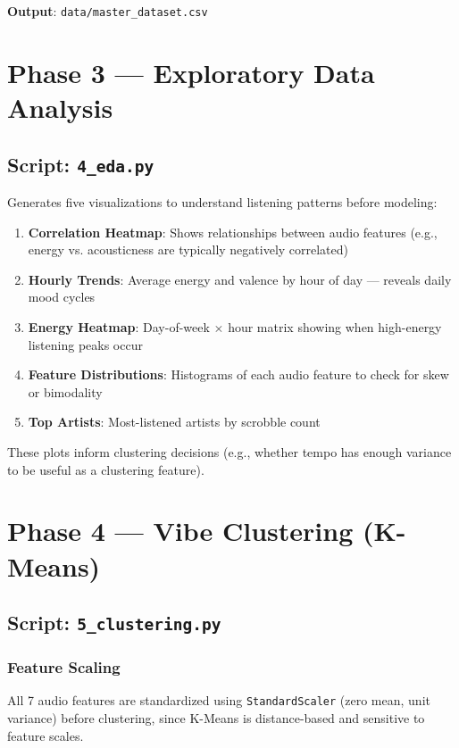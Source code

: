 \documentclass[12pt, a4paper]{article}
\begin{document}
\textbf{Output}: \texttt{data/master\_dataset.csv}

\section{Phase 3 — Exploratory Data Analysis}

\subsection{Script: \texttt{4\_eda.py}}

Generates five visualizations to understand listening patterns before modeling:

\begin{enumerate}
    \item \textbf{Correlation Heatmap}: Shows relationships between audio features (e.g., energy vs. acousticness are typically negatively correlated)
    \item \textbf{Hourly Trends}: Average energy and valence by hour of day — reveals daily mood cycles
    \item \textbf{Energy Heatmap}: Day-of-week $\times$ hour matrix showing when high-energy listening peaks occur
    \item \textbf{Feature Distributions}: Histograms of each audio feature to check for skew or bimodality
    \item \textbf{Top Artists}: Most-listened artists by scrobble count
\end{enumerate}

These plots inform clustering decisions (e.g., whether tempo has enough variance to be useful as a clustering feature).

\section{Phase 4 — Vibe Clustering (K-Means)}

\subsection{Script: \texttt{5\_clustering.py}}

\subsubsection{Feature Scaling}
All 7 audio features are standardized using \texttt{StandardScaler} (zero mean, unit variance) before clustering, since K-Means is distance-based and sensitive to feature scales.
\end{document}
